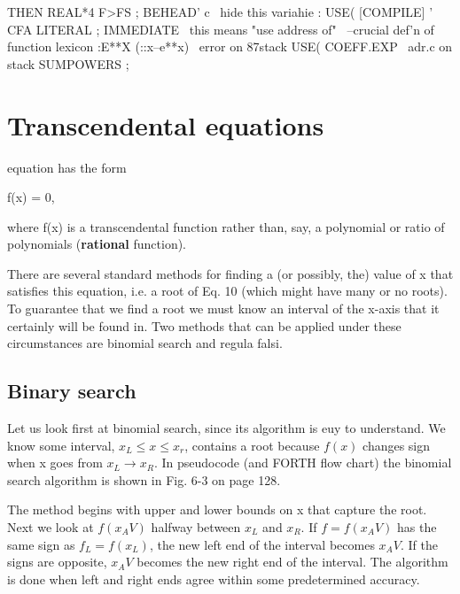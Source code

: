     THEN REAL*4 F>FS ;
BEHEAD' c \ hide this variahie
: USE( [COMPILE] ' CFA LITERAL ;
    IMMEDIATE
\ this means "use address of"
\ --crucial def'n of function lexicon
:E**X (::x--e**x) %
            \ error on 87stack
    USE( COEFF.EXP
            \ adr.c on stack
    SUMPOWERS ;

\section{Transcendental equations}

 equation has the form

f(x) = 0,

where f(x) is a transcendental function rather than, say, a polynomial or ratio of polynomials (\textbf{rational} function).

There are several standard methods for finding a (or possibly, the) value of x that satisfies this equation, i.e. a root of Eq. 10 (which might have many or no roots). To guarantee that we find a root we must know an interval of the x-axis that it certainly will be found in. Two methods that can be applied under these circumstances are binomial search and regula falsi.

\subsection{Binary search}

Let us look first at binomial search, since its algorithm is euy to understand. We know some interval, $x_L \leq x \leq x_r$, contains a root because $f(x)$ changes sign when x goes from $x_L \rightarrow x_R$. In pseudocode (and FORTH flow chart) the binomial search algorithm is shown in Fig. 6-3 on page 128.

The method begins with upper and lower bounds on x that capture the root. Next we look at $f(x_AV)$ halfway between $x_L$ and $x_R$. If $f=f(x_AV)$ has the same sign as $f_L = f(x_L)$, the new left end of the interval becomes $x_AV$. If the signs are opposite, $x_AV$ becomes the new right end of the interval. The algorithm is done when left and right ends agree within some predetermined accuracy.

